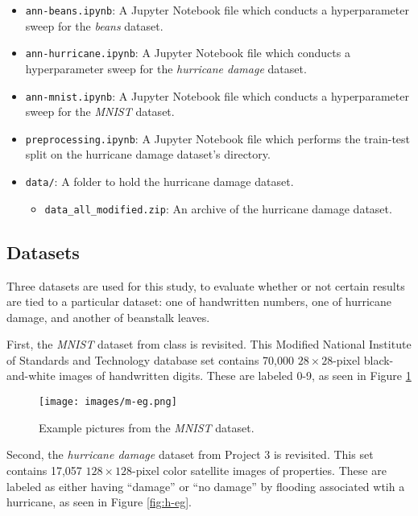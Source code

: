 \documentclass{article}
\begin{document}
\begin{itemize}
	\item \verb|ann-beans.ipynb|: A Jupyter Notebook file which conducts a hyperparameter sweep for the \emph{beans} dataset.
	\item \verb|ann-hurricane.ipynb|: A Jupyter Notebook file which conducts a hyperparameter sweep for the \emph{hurricane damage} dataset.
	\item \verb|ann-mnist.ipynb|: A Jupyter Notebook file which conducts a hyperparameter sweep for the \emph{MNIST} dataset.
	\item \verb|preprocessing.ipynb|: A Jupyter Notebook file which performs the train-test split on the hurricane damage dataset's directory.
	\item \verb|data/|: A folder to hold the hurricane damage dataset.
	\begin{itemize}
		\item \verb|data_all_modified.zip|: An archive of the hurricane damage dataset.
	\end{itemize}
\end{itemize}

\subsection{Datasets}

Three datasets are used for this study, to evaluate whether or not certain results are tied to a particular dataset: one of handwritten numbers, one of hurricane damage, and another of beanstalk leaves.

First, the \emph{MNIST} \cite{mnistdata} dataset from class is revisited. This Modified National Institute of Standards and Technology database set contains 70,000 $28 \times 28$-pixel black-and-white images of handwritten digits. These are labeled 0-9, as seen in Figure \ref{fig:m-eg}

\begin{figure}
	\centering
	\texttt{[image: images/m-eg.png]}
	\caption{Example pictures from the \emph{MNIST} dataset.}
	\label{fig:m-eg}
\end{figure}

Second, the \emph{hurricane damage} \cite{hurricanedata} dataset from Project 3 is revisited. This set contains 17,057 $128 \times 128$-pixel color satellite images of properties. These are labeled as either having ``damage'' or ``no damage'' by flooding associated wtih a hurricane, as seen in Figure \ref{fig:h-eg}.
\end{document}
